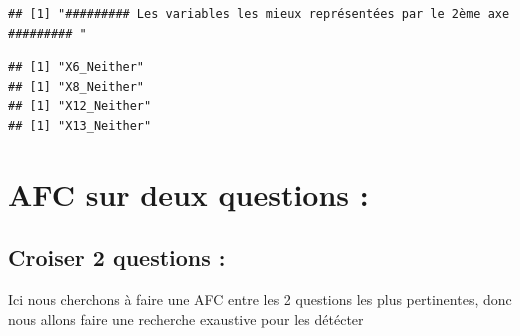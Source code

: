 \documentclass[
]{article}
\newenvironment{Shaded}{\begin{snugshade}}{\end{snugshade}}
\newcommand{\AttributeTok}[1]{\textcolor[rgb]{0.77,0.63,0.00}{#1}}
\newcommand{\ControlFlowTok}[1]{\textcolor[rgb]{0.13,0.29,0.53}{\textbf{#1}}}
\newcommand{\DecValTok}[1]{\textcolor[rgb]{0.00,0.00,0.81}{#1}}
\newcommand{\FloatTok}[1]{\textcolor[rgb]{0.00,0.00,0.81}{#1}}
\newcommand{\FunctionTok}[1]{\textcolor[rgb]{0.00,0.00,0.00}{#1}}
\newcommand{\NormalTok}[1]{#1}
\newcommand{\SpecialCharTok}[1]{\textcolor[rgb]{0.00,0.00,0.00}{#1}}
\newcommand{\StringTok}[1]{\textcolor[rgb]{0.31,0.60,0.02}{#1}}
\begin{document}
\begin{verbatim}
## [1] "######### Les variables les mieux représentées par le 2ème axe ######### "
\end{verbatim}

\begin{Shaded}
\end{Shaded}

\begin{verbatim}
## [1] "X6_Neither"
## [1] "X8_Neither"
## [1] "X12_Neither"
## [1] "X13_Neither"
\end{verbatim}

\hypertarget{afc-sur-deux-questions}{%
\section{AFC sur deux questions :}\label{afc-sur-deux-questions}}

\hypertarget{croiser-2-questions}{%
\subsection{Croiser 2 questions :}\label{croiser-2-questions}}

Ici nous cherchons à faire une AFC entre les 2 questions les plus
pertinentes, donc nous allons faire une recherche exaustive pour les
détécter
\end{document}
